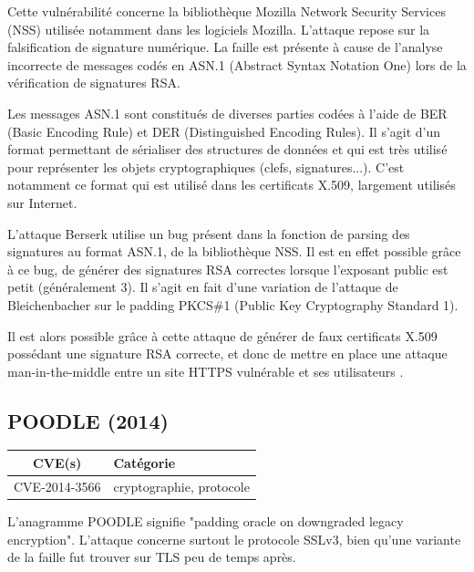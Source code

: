 \vspace{1em}

Cette vulnérabilité concerne la bibliothèque Mozilla Network Security Services (NSS) utilisée notamment dans les logiciels Mozilla. L'attaque repose sur la falsification de signature numérique. La faille est présente à cause de l'analyse incorrecte de messages codés en ASN.1 (Abstract Syntax Notation One) lors de la vérification de signatures RSA.

Les messages ASN.1 sont constitués de diverses parties codées à l'aide de BER (Basic Encoding Rule) et DER (Distinguished Encoding Rules). Il s'agit d'un format permettant de sérialiser des structures de données et qui est très utilisé pour représenter les objets cryptographiques (clefs, signatures...). C'est notamment ce format qui est utilisé dans les certificats X.509, largement utilisés sur Internet.

L'attaque Berserk utilise un bug présent dans la fonction de parsing des signatures au format ASN.1, de la bibliothèque NSS. Il est en effet possible grâce à ce bug, de générer des signatures RSA correctes lorsque l'exposant public est petit (généralement 3). Il s'agit en fait d'une variation de l'attaque de Bleichenbacher sur le padding PKCS\#1 (Public Key Cryptography Standard 1).

Il est alors possible grâce à cette attaque de générer de faux certificats X.509 possédant une signature RSA correcte, et donc de mettre en place une attaque man-in-the-middle entre un site HTTPS vulnérable et ses utilisateurs \cite{berserk}.




\subsection{POODLE (2014)}

\begin{tabularx}{0.96\textwidth}{|c|X|}
  \hline
  \textbf{CVE(s)} & \textbf{Catégorie} \\
  \hline
  CVE-2014-3566 & cryptographie, protocole \\
  \hline
\end{tabularx}

\vspace{1em}

L'anagramme POODLE signifie "padding oracle on downgraded legacy encryption". L'attaque concerne surtout le protocole SSLv3, bien qu'une variante de la faille fut trouver sur TLS peu de temps après.

